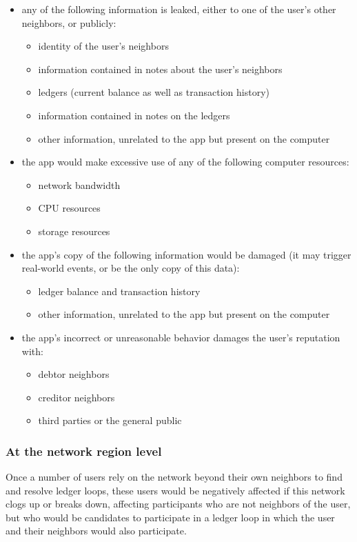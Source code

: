 \documentclass[11pt,twoside,a4paper]{article}
\begin{document}
\begin{itemize}
\item any of the following information is leaked, either to one of the user's other neighbors, or publicly:
  \begin{itemize}
  \item identity of the user's neighbors
  \item information contained in notes about the user's neighbors
  \item ledgers (current balance as well as transaction history)
  \item information contained in notes on the ledgers
  \item other information, unrelated to the app but present on the computer
  \end{itemize}
  
\item the app would make excessive use of any of the following computer resources:
  \begin{itemize}
  \item network bandwidth
  \item CPU resources
  \item storage resources
  \end{itemize}
  
\item the app's copy of the following information would be damaged (it may trigger real-world events, or be the only copy of this data):
  \begin{itemize}
  \item ledger balance and transaction history
  \item other information, unrelated to the app but present on the computer
  \end{itemize}
  
\item the app's incorrect or unreasonable behavior damages the user's reputation with:
  \begin{itemize}
  \item debtor neighbors
  \item creditor neighbors
  \item third parties or the general public
  \end{itemize}
\end{itemize}

\subsubsection{At the network region level}
Once a number of users rely on the network beyond their own neighbors to find and resolve ledger loops, these users would be negatively
affected if this network clogs up or breaks down, affecting participants who are not neighbors of the user, but who would be candidates
to participate in a ledger loop in which the user and their neighbors would also participate.
\end{document}
